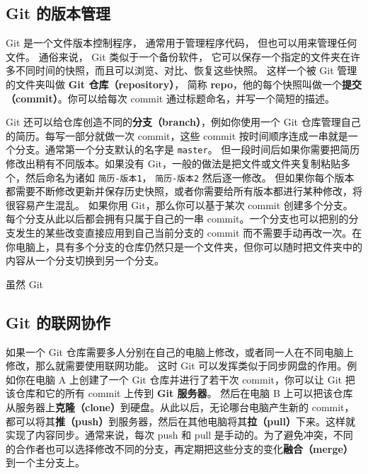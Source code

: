 \begin{issues}
\issueTODO
\end{issues}

\subsection{Git 的版本管理}
Git 是一个文件版本控制程序， 通常用于管理程序代码， 但也可以用来管理任何文件。 通俗来说， Git 类似于一个备份软件， 它可以保存一个指定的文件夹在许多不同时间的快照，而且可以浏览、对比、恢复这些快照。 这样一个被 Git 管理的文件夹叫做 \textbf{Git 仓库（repository）}， 简称 \textbf{repo}，他的每个快照叫做一个\textbf{提交（commit）}。你可以给每次 commit 通过标题命名，并写一个简短的描述。


Git 还可以给仓库创造不同的\textbf{分支（branch）}，例如你使用一个 Git 仓库管理自己的简历。每写一部分就做一次 commit，这些 commit 按时间顺序连成一串就是一个分支。通常第一个分支默认的名字是 \verb`master`。 但一段时间后如果你需要把简历修改出稍有不同版本。如果没有 Git，一般的做法是把文件或文件夹复制粘贴多个，然后命名为诸如 \verb`简历-版本1`， \verb`简历-版本2` 然后逐一修改。 但如果你每个版本都需要不断修改更新并保存历史快照，或者你需要给所有版本都进行某种修改，将很容易产生混乱。 如果你用 Git，那么你可以基于某次 commit 创建多个分支。每个分支从此以后都会拥有只属于自己的一串 commit。一个分支也可以把别的分支发生的某些改变直接应用到自己当前分支的 commit 而不需要手动再改一次。在你电脑上，具有多个分支的仓库仍然只是一个文件夹，但你可以随时把文件夹中的内容从一个分支切换到另一个分支。

虽然 Git 

\subsection{Git 的联网协作}
如果一个 Git 仓库需要多人分别在自己的电脑上修改，或者同一人在不同电脑上修改，那么就需要使用联网功能。 这时 Git 可以发挥类似于同步网盘的作用。例如你在电脑 A 上创建了一个 Git 仓库并进行了若干次 commit，你可以让 Git 把该仓库和它的所有 commit 上传到 \textbf{Git 服务器}。 然后在电脑 B 上可以把该仓库从服务器上\textbf{克隆（clone）}到硬盘。从此以后，无论哪台电脑产生新的 commit，都可以将其\textbf{推（push）}到服务器，然后在其他电脑将其\textbf{拉（pull）}下来。这样就实现了内容同步。通常来说，每次 push 和 pull 是手动的。为了避免冲突，不同的合作者也可以选择修改不同的分支，再定期把这些分支的变化\textbf{融合（merge）}到一个主分支上。

